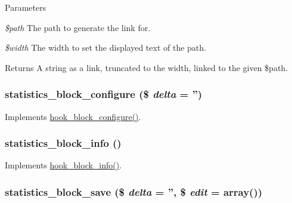 \begin{DoxyParams}{Parameters}
\item[{\em \$path}]The path to generate the link for. \item[{\em \$width}]The width to set the displayed text of the path.\end{DoxyParams}
\begin{DoxyReturn}{Returns}
A string as a link, truncated to the width, linked to the given \$path. 
\end{DoxyReturn}
\hypertarget{statistics_8module_a54467449f7ad4e5a97345cf740088189}{
\subsubsection[{statistics\_\-block\_\-configure}]{\setlength{\rightskip}{0pt plus 5cm}statistics\_\-block\_\-configure (\$ {\em delta} = {\ttfamily ''})}}
\label{statistics_8module_a54467449f7ad4e5a97345cf740088189}
Implements \hyperlink{group__hooks_gacc86fefd1e0299f387f79a37dd1a48b7}{hook\_\-block\_\-configure()}. \hypertarget{statistics_8module_a1c81f45147184c934466f8359761f91f}{
\subsubsection[{statistics\_\-block\_\-info}]{\setlength{\rightskip}{0pt plus 5cm}statistics\_\-block\_\-info ()}}
\label{statistics_8module_a1c81f45147184c934466f8359761f91f}
Implements \hyperlink{group__hooks_ga2bd926c3e90deeba0c3ba64fb3c64d73}{hook\_\-block\_\-info()}. \hypertarget{statistics_8module_a1a71da55c633b8226c93ddb71fa8af5f}{
\subsubsection[{statistics\_\-block\_\-save}]{\setlength{\rightskip}{0pt plus 5cm}statistics\_\-block\_\-save (\$ {\em delta} = {\ttfamily ''}, \/  \$ {\em edit} = {\ttfamily array()})}}

